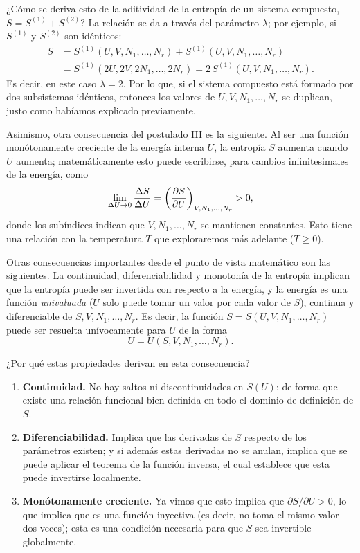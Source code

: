 ¿Cómo se deriva esto de la aditividad de la entropía de un sistema compuesto,
$S=S^{(1)}+S^{(2)}$? La relación se da a través del parámetro $\lambda$; por ejemplo, si $S^{(1)}$ y
$S^{(2)}$ son idénticos:
\begin{align*}
  S&=S^{(1)}(U,V,N_1,\dots,N_r)+S^{(1)}(U,V,N_1,\dots,N_r)\\
   &=S^{(1)}(2U,2V,2N_1,\dots,2N_r)=2\,S^{(1)}(U,V,N_1,\dots,N_r).
\end{align*}
Es decir, en este caso $\lambda=2$. Por lo que, si el sistema compuesto está formado por dos
subsistemas idénticos, entonces los valores de $U,V,N_1,\dots,N_r$ se duplican, justo como habíamos
explicado previamente.

Asimismo, otra consecuencia del postulado III es la siguiente. Al ser una función monótonamente
creciente de la energía interna $U$, la entropía $S$ aumenta cuando $U$ aumenta; matemáticamente
esto puede escribirse, para cambios infinitesimales de la energía, como
\begin{equation*}
  \lim_{\Delta U\to0}\frac{\Delta S}{\Delta U}=\left(\frac{\partial S}{\partial U}\right)_{V,N_1,\dots,N_r}>0,
\end{equation*}
donde los subíndices indican que $V,N_1,\dots,N_r$ se mantienen constantes. Esto tiene una relación
con la temperatura $T$ que exploraremos más adelante ($T\geq0$).

Otras consecuencias importantes desde el punto de vista matemático son las siguientes. La
continuidad, diferenciabilidad y monotonía de la entropía implican que la entropía puede ser
invertida con respecto a la energía, y la energía es una función \emph{univaluada} ($U$ solo puede
tomar un valor por cada valor de $S$), continua y diferenciable de $S,V,N_1,\dots,N_r$. Es decir,
la función $S=S(U,V,N_1,\dots,N_r)$ puede ser resuelta unívocamente para $U$ de la forma
\begin{equation*}
  U=U(S,V,N_1,\dots,N_r).
\end{equation*}

¿Por qué estas propiedades derivan en esta consecuencia?
\begin{enumerate}[label=\arabic*.,itemsep=3pt]
  \item \textbf{Continuidad.} No hay saltos ni discontinuidades en $S(U)$; de forma que existe una
    relación funcional bien definida en todo el dominio de definición de $S$.
  \item \textbf{Diferenciabilidad.} Implica que las derivadas de $S$ respecto de los parámetros
    existen; y si además estas derivadas no se anulan, implica que se puede aplicar el teorema de
    la función inversa, el cual establece que esta puede invertirse localmente.
  \item \textbf{Monótonamente creciente.} Ya vimos que esto implica que $\partial S/\partial U>0$, lo
    que implica que es una función inyectiva (es decir, no toma el mismo valor dos veces); esta es
    una condición necesaria para que $S$ sea invertible globalmente.
\end{enumerate}

